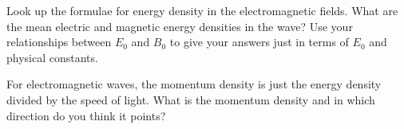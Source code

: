 \documentclass[12pt]{article}
\begin{document}
Look up the formulae for energy density
in the electromagnetic fields. What are the mean electric and magnetic energy densities
in the wave? Use your relationships between $E_0$ and $B_0$ to give
your answers just in terms of $E_0$ and physical constants.

For electromagnetic waves, the momentum density is just the energy density
divided by the speed of light. What is the momentum density and in which
direction do you think it points?
\end{document}
